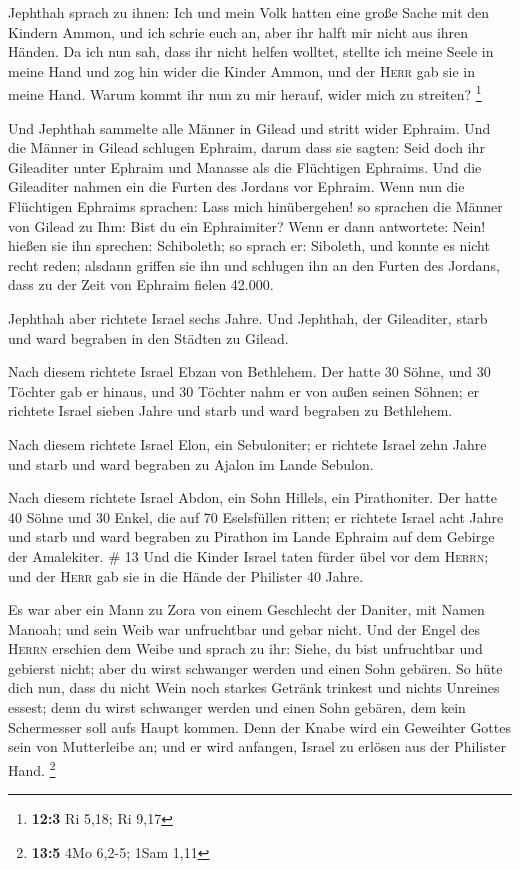  Jephthah sprach zu ihnen: Ich und mein Volk hatten eine
große Sache mit den Kindern Ammon, und ich schrie euch an, aber ihr
halft mir nicht aus ihren Händen.  Da ich nun sah, dass
ihr nicht helfen wolltet, stellte ich meine Seele in meine Hand und zog
hin wider die Kinder Ammon, und der \textsc{Herr} gab sie in meine Hand.
Warum kommt ihr nun zu mir herauf, wider mich zu streiten? \footnote{\textbf{12:3}
  Ri 5,18; Ri 9,17}

 Und Jephthah sammelte alle Männer in Gilead und stritt
wider Ephraim. Und die Männer in Gilead schlugen Ephraim, darum dass sie
sagten: Seid doch ihr Gileaditer unter Ephraim und Manasse als die
Flüchtigen Ephraims.  Und die Gileaditer nahmen ein die
Furten des Jordans vor Ephraim. Wenn nun die Flüchtigen Ephraims
sprachen: Lass mich hinübergehen! so sprachen die Männer von Gilead zu
Ihm: Bist du ein Ephraimiter? Wenn er dann antwortete: Nein!
 hießen sie ihn sprechen: Schiboleth; so sprach er:
Siboleth, und konnte es nicht recht reden; alsdann griffen sie ihn und
schlugen ihn an den Furten des Jordans, dass zu der Zeit von Ephraim
fielen 42.000.

 Jephthah aber richtete Israel sechs Jahre. Und Jephthah,
der Gileaditer, starb und ward begraben in den Städten zu Gilead.

 Nach diesem richtete Israel Ebzan von Bethlehem.
 Der hatte 30 Söhne, und 30 Töchter gab er hinaus, und 30
Töchter nahm er von außen seinen Söhnen; er richtete Israel sieben Jahre
 und starb und ward begraben zu Bethlehem.

 Nach diesem richtete Israel Elon, ein Sebuloniter; er
richtete Israel zehn Jahre  und starb und ward begraben
zu Ajalon im Lande Sebulon.

 Nach diesem richtete Israel Abdon, ein Sohn Hillels, ein
Pirathoniter.  Der hatte 40 Söhne und 30 Enkel, die auf
70 Eselsfüllen ritten; er richtete Israel acht Jahre  und
starb und ward begraben zu Pirathon im Lande Ephraim auf dem Gebirge der
Amalekiter. \# 13  Und die Kinder Israel taten fürder übel
vor dem \textsc{Herrn}; und der \textsc{Herr} gab sie in die Hände der
Philister 40 Jahre.

 Es war aber ein Mann zu Zora von einem Geschlecht der
Daniter, mit Namen Manoah; und sein Weib war unfruchtbar und gebar
nicht.  Und der Engel des \textsc{Herrn} erschien dem
Weibe und sprach zu ihr: Siehe, du bist unfruchtbar und gebierst nicht;
aber du wirst schwanger werden und einen Sohn gebären.  So
hüte dich nun, dass du nicht Wein noch starkes Getränk trinkest und
nichts Unreines essest;  denn du wirst schwanger werden
und einen Sohn gebären, dem kein Schermesser soll aufs Haupt kommen.
Denn der Knabe wird ein Geweihter Gottes sein von Mutterleibe an; und er
wird anfangen, Israel zu erlösen aus der Philister Hand. \footnote{\textbf{13:5}
  4Mo 6,2-5; 1Sam 1,11}

